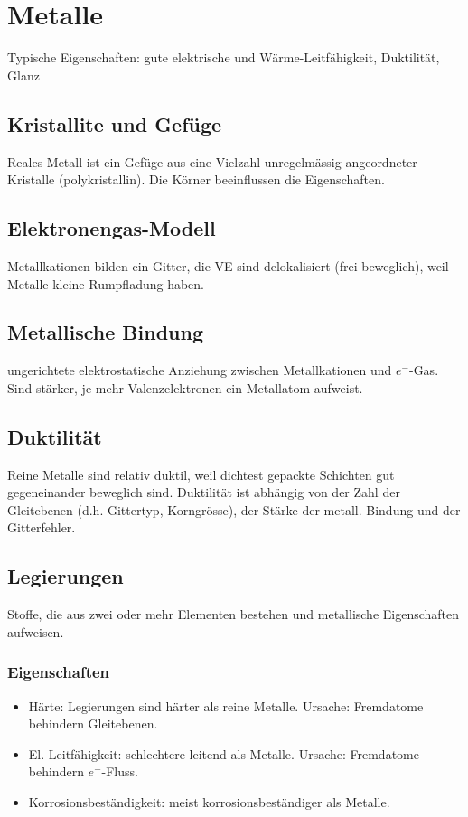 \section{Metalle}
Typische Eigenschaften: gute elektrische und Wärme-Leitfähigkeit, Duktilität, Glanz

\subsection{Kristallite und Gefüge}
Reales Metall ist ein Gefüge aus eine Vielzahl unregelmässig angeordneter Kristalle (polykristallin). Die Körner beeinflussen die Eigenschaften.

\subsection{Elektronengas-Modell}
Metallkationen bilden ein Gitter, die VE sind delokalisiert (frei beweglich), weil Metalle kleine Rumpfladung haben. 

\subsection{Metallische Bindung}
ungerichtete elektrostatische Anziehung zwischen Metallkationen und $e^-$-Gas. Sind stärker, je mehr Valenzelektronen ein Metallatom aufweist.

\subsection{Duktilität}
Reine Metalle sind relativ duktil, weil dichtest gepackte Schichten gut gegeneinander beweglich sind. Duktilität ist abhängig von der Zahl der Gleitebenen (d.h. Gittertyp, Korngrösse), der Stärke der metall. Bindung und der Gitterfehler. 

\subsection{Legierungen}
Stoffe, die aus zwei oder mehr Elementen bestehen und metallische Eigenschaften aufweisen.

\subsubsection{Eigenschaften}
\begin{itemize}
	\item Härte: Legierungen sind härter als reine Metalle. Ursache: Fremdatome behindern Gleitebenen.
	\item El. Leitfähigkeit: schlechtere leitend als Metalle. Ursache: Fremdatome behindern $e^-$-Fluss.
	\item Korrosionsbeständigkeit: meist korrosionsbeständiger als Metalle.
\end{itemize}

